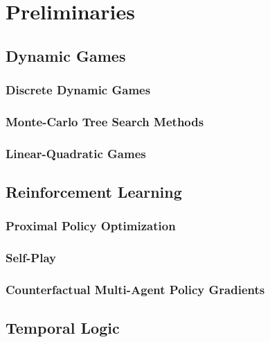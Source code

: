 \chapter{Preliminaries} \label{chapter:prelim}
\section{Dynamic Games} %
\subsection{Discrete Dynamic Games} %
\subsection{Monte-Carlo Tree Search Methods} %
\subsection{Linear-Quadratic Games} %
\section{Reinforcement Learning} %
\subsection{Proximal Policy Optimization} %
\subsection{Self-Play} %
\subsection{Counterfactual Multi-Agent Policy Gradients} %
\section{Temporal Logic} %

